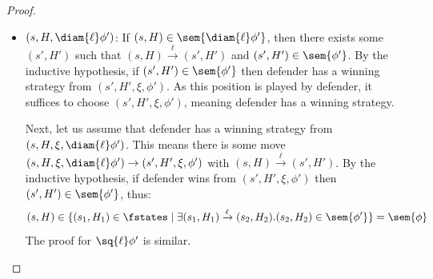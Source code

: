 \begin{proof}
\begin{itemize}
		The proof for $\bigwedge_x \phi'$ and $\fresh{x} \phi'$ is similar.
				\item $(s, H,\diam{\ell} \phi')$: If $(s, H)\in \sem{\diam{\ell} \phi'}$, then there exists some $(s', H')$ such that $(s, H) \xrightarrow{\ell} (s', H')$ and $(s', H')\in \sem{\phi'}$. 
		By the inductive hypothesis, if $(s', H')\in \sem{\phi'}$ then defender has a winning strategy from $(s', H', \xi, \phi')$.
		As this position is played by defender, it suffices to choose $(s', H', \xi, \phi')$, meaning defender has a winning strategy.  
		
		Next, let us assume that defender has a winning strategy from $(s, H, \xi, \diam{\ell} \phi')$. 
		This means there is some move $(s, H, \xi, \diam{\ell} \phi') \to (s', H', \xi, \phi')$ with $(s, H) \xrightarrow{\ell} (s', H')$. 
		By the inductive hypothesis, if defender wins from $(s', H', \xi, \phi')$ then $(s', H') \in \sem{\phi'}$, thus:
		\[
			(s, H) \in \{(s_1, H_1) \in \fstates \mid \exists (s_1, H_1) \xrightarrow{\ell} (s_2, H_2).(s_2, H_2) \in \sem{\phi'}\} = \sem{\phi}
		\]	
		The proof for $\sq{\ell} \phi'$ is similar.
		

\end{itemize}
\end{proof}
